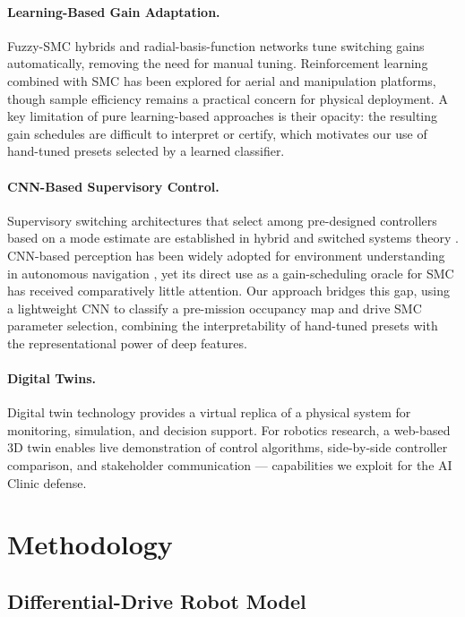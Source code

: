 \documentclass[11pt,a4paper]{article}
\begin{document}
\paragraph{Learning-Based Gain Adaptation.}
Fuzzy-SMC hybrids \cite{lin2006} and radial-basis-function networks \cite{ge2004} tune
switching gains automatically, removing the need for manual tuning. Reinforcement learning
combined with SMC has been explored for aerial \cite{nguyen2018} and manipulation
platforms, though sample efficiency remains a practical concern for physical deployment.
A key limitation of pure learning-based approaches is their opacity: the resulting gain
schedules are difficult to interpret or certify, which motivates our use of hand-tuned
presets selected by a learned classifier.

\paragraph{CNN-Based Supervisory Control.}
Supervisory switching architectures that select among pre-designed controllers based on a
mode estimate are established in hybrid and switched systems theory \cite{liberzon2003}.
CNN-based perception has been widely adopted for environment understanding in autonomous
navigation \cite{lecun2015,levine2016}, yet its direct use as a gain-scheduling oracle for
SMC has received comparatively little attention. Our approach bridges this gap, using a
lightweight CNN to classify a pre-mission occupancy map and drive SMC parameter selection,
combining the interpretability of hand-tuned presets with the representational power of
deep features.

\paragraph{Digital Twins.}
Digital twin technology provides a virtual replica of a physical system for monitoring,
simulation, and decision support. For robotics research, a web-based 3D twin enables live
demonstration of control algorithms, side-by-side controller comparison, and stakeholder
communication --- capabilities we exploit for the AI Clinic defense.

\section{Methodology}

\subsection{Differential-Drive Robot Model}
\end{document}
